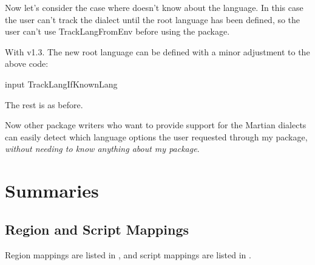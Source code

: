 \documentclass[titlepage=false,oneside,
 fontsize=12pt,captions=tableheading]{scrbook}
\begin{document}
Now let's consider the case where  doesn't know
about the  language. In this case the user can't 
track the dialect until the root language has been defined, so the
user can't use \gls{TrackLangFromEnv} before using the 
package.

With  v1.3. The new root language can be defined
with a minor adjustment to the above code:
\begin{codebox*}[fontupper=\small\ttfamily]
\codepar
\gls{input}
\codepar
\gls{TrackLangIfKnownLang}
\comment{}
\end{codebox*}
The rest is as before.

Now other package writers who want to provide support
for the Martian dialects can easily detect which language options
the user requested through my package, \emph{without needing to know
anything about my  package}.

\part{Summaries}
\appendix

\chapter{Region and Script Mappings}
\label{sec:regscriptmappings}

Region mappings are listed in , and
script mappings are listed in .

\printunsrttable[type=index,
 title={Region Mappings},other={alpha3},blocks=2,
 block-style={name-other-desc},label={tab:regionmappings},
 init={%
 \renewcommand{\glstableNameTarget}[1]{\inlineglsdef[optdef]{##1}}%
 \renewcommand{\glstableiffilter}[3]{\glsifcategory{##1}{region}{##3}{##2}}%
 \renewcommand{\glstablenameheader}{Alpha-2}%
 \renewcommand{\glstableotherheader}{Alpha-3}%
 \renewcommand{\glstabledescheader}{Numeric}%
 \renewcommand{\glstableDesc}{\numerictag}%
}
]

\printunsrttable[type=index,clearpage,par=ragged,
 title={Script Mappings},other=userii,blocks=1,
 block-style={name-symbol-other-desc},label={tab:scriptmappings},
 init={%
 \renewcommand{\glstableNameTarget}[1]{\inlineglsdef[optdef]{##1}}%
 \renewcommand{\glstableiffilter}[3]{\glsifcategory{##1}{script}{##3}{##2}}%
 \renewcommand{\glstablenameheader}{Alpha-2}%
 \renewcommand{\glstablesymbolheader}{Numeric}%
 \renewcommand{\glstableSymbol}{\numerictag}%
 \renewcommand{\glstableotherheader}{Direction}%
}
]
\end{document}
